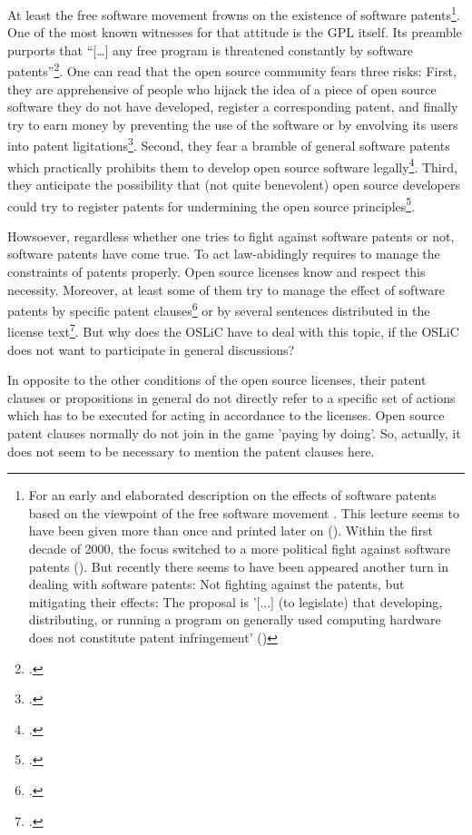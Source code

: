 At least the free software movement frowns on the existence of software
patents\footnote{For an early and elaborated description on the effects of
software patents based on the viewpoint of the free software movement
\cite[see][\nopage wp]{Stallman2001a}. This lecture seems to have been given
more than once and printed later on (\cite[cf.][\nopage wp]{Stallman2002a}).
Within the first decade of 2000, the focus switched to a more political fight
against software patents (\cite[cf.][\nopage wp]{Stallman2004a}). But recently
there seems to have been appeared another turn in dealing with software patents:
Not fighting against the patents, but mitigating their effects: The proposal is
'[...] (to legislate) that developing, distributing, or running a program on
generally used computing hardware does not constitute patent infringement'
(\cite[cf.][\nopage wp]{Stallman2012a})}. One of the most known witnesses for
that attitude is the GPL itself. Its preamble purports that \enquote{[\ldots]
any free program is threatened constantly by software
patents}\footcite[cf.][wp]{Gpl20OsiLicense1991a}. One can read that the open
source community fears three risks: First, they are apprehensive of people who
hijack the idea of a piece of open source software they do not have developed,
register a corresponding patent, and finally try to earn money by preventing the
use of the software or by envolving its users into patent
ligitations\footcite[cf.][234]{JaeMet2011a}. Second, they fear a bramble of
general software patents which practically prohibits them to develop open source
software legally\footcite[cf.][234]{JaeMet2011a}. Third, they anticipate the
possibility that (not quite benevolent) open source developers could try to
register patents for undermining the open source
principles\footcite[cf.][235]{JaeMet2011a}.

Howsoever, regardless whether one tries to fight against software patents or not,
software patents have come true. To act law-abidingly requires to manage the
constraints of patents properly. Open source licenses know and respect this
necessity. Moreover, at least some of them try to manage the effect of software
patents by specific patent clauses\footcite[pars pro toto cf.][\nopage wp
§3]{Apl20OsiLicense2004a} or by several sentences distributed in the license
text\footcite[pars pro toto cf.][\nopage wp]{Epl10OsiLicense2005a}. But why
does the OSLiC have to deal with this topic, if the OSLiC does not want to
participate in general discussions?

In opposite to the other conditions of the open source licenses, their patent
clauses or propositions in general do not directly refer to a specific set of
actions which has to be executed for acting in accordance to the licenses. Open
source patent clauses normally do not join in the game 'paying by doing'. So,
actually, it does not seem to be necessary to mention the patent clauses here.

